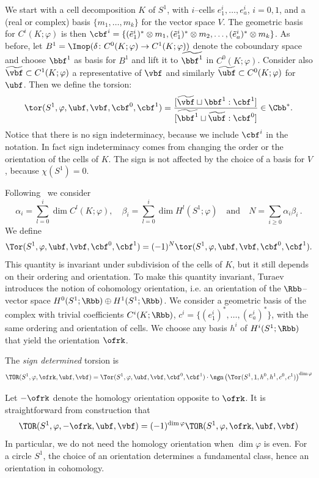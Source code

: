 We start with a cell decomposition $K$ of $S^1$, with $i$--cells $e^i_1,\dots, e^i_a$, $i=0,1$, and a (real or complex) basis $\{m_1,\dots,m_k\}$ for the vector space $V$. The geometric basis for $C^i(K;\varphi)$ is then $\cbf^i=\{(\tilde e^i_1)^*\otimes m_1,(\tilde e^i_1)^*\otimes m_2,\dots, (\tilde e^i_a)^*\otimes m_k \}$. As before, let $B^1=\Imop (\delta\colon C^0(K;\varphi)\to C^1(K;\varphi))$ denote the coboundary space and choose $\bbf^1$ as basis for $B^1$ and lift it to $\widetilde{\bbf^1}$ in $ C^0(K;\varphi) $. Consider also $\widetilde{\vbf}\subset C^1(K;\varphi) $ a representative of $\vbf$ and similarly $\widetilde{\ubf}\subset C^0(K;\varphi) $ for $\ubf$. Then we define the torsion:
\[
\tor(S^1, \varphi, \ubf,\vbf,\cbf^0,\cbf^1)=
\frac{[\widetilde {\vbf}\sqcup\bbf^1 : \cbf^1]} {[\widetilde{\bbf^1}\sqcup \widetilde {\ubf} : \cbf^0]}
\in \Cbb^*.
\]
Notice that there is no sign indeterminacy, because we include $ \cbf^i $ in the notation. In fact sign indeterminacy comes from changing the order or the orientation of the cells of $K$. The sign is not affected by the choice of a basis for $V$, because $\chi(S^1)=0$.

Following~\cite[Section~3]{TuraevKnotTheory} we consider
\[
\alpha_i=\sum_{l=0}^i\dim C^l(K;\varphi), \quad \beta_i= \sum_{l=0}^i\dim H^l(S^1;\varphi) \quad\text{and}\quad N=\sum_{i\geq 0}\alpha_i\beta_i\,.
\]
We define
\[
\Tor(S^1, \varphi, \ubf,\vbf,\cbf^0,\cbf^1)= (-1)^N\tor(S^1, \varphi, \ubf,\vbf,\cbf^0,\cbf^1).
\]
This quantity is invariant under subdivision of the cells of $K$, but it still depends on their ordering and orientation. To make this quantity invariant, Turaev introduces the notion of cohomology orientation, i.e. an orientation of the $\Rbb$--vector space $H^0(S^1;\Rbb)\oplus H^1(S^1;\Rbb)$. We consider a geometric basis of the complex with trivial coefficients $C^i(K; \Rbb)$, ${c}^i=\{(e^i_1)^*,\dots, (e^i_a)^*\}$, with the same ordering and orientation of cells. We choose any basis $h^i$ of $H^i(S^1;\Rbb)$ that yield the orientation $\ofrk$.

\begin{defi}
The \emph{sign determined} torsion is
\[
\TOR(S^1,\varphi,\ofrk,\ubf,\vbf)=
\Tor(S^1, \varphi, \ubf,\vbf,\cbf^0,\cbf^1)\cdot
\sgn \left(\Tor(S^1, 1, h^0,h^1,{c}^0,{c}^1)\right)^{\dim\varphi}
\]
\end{defi}

Let $-\ofrk$ denote the homology orientation opposite to $\ofrk$. It is straightforward from construction that
\begin{equation}\label{eq:change_or}
\TOR(S^1,\varphi,-\ofrk,\ubf,\vbf)= (-1)^{\dim\varphi}\TOR(S^1,\varphi,\ofrk,\ubf,\vbf)
\end{equation}
In particular, we do not need the homology orientation when $\dim\varphi$ is even. For a circle $S^1$, the choice of an orientation determines a fundamental class, hence an orientation in cohomology.

